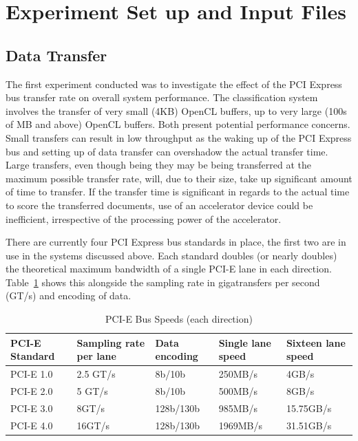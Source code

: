 \section{Experiment Set up and Input Files}

\subsection{Data Transfer}

The first experiment conducted was to investigate the effect of the PCI Express
bus transfer rate on overall system performance. The classification system
involves the transfer of very small (4KB) OpenCL buffers, up to very large (100s
of MB and above) OpenCL buffers. Both present potential performance concerns.
Small transfers can result in low throughput as the waking up of the PCI Express
bus and setting up of data transfer can overshadow the actual transfer time.
Large transfers, even though being they may be being transferred at the maximum
possible transfer rate, will, due to their size, take up significant amount of
time to transfer. If the transfer time is significant in regards to the actual
time to score the transferred documents, use of an accelerator device could be
inefficient, irrespective of the processing power of the accelerator.

There are currently four PCI Express bus standards in place, the first two are
in use in the systems discussed above. Each standard doubles (or nearly doubles)
the theoretical maximum bandwidth of a single PCI-E lane in each direction.
Table~\ref{table:pciE} shows this alongside the sampling rate in gigatransfers
per second (GT/s) and encoding of data.

\begin{table}[H]
\begin{tabular}{|l|l|l|l|l|}
\hline
PCI-E Standard & Sampling rate per lane & Data encoding & Single lane speed &
Sixteen lane speed\\
\hline
PCI-E 1.0 & 2.5 GT/s & 8b/10b & 250MB/s & 4GB/s\\
\hline
PCI-E 2.0 & 5 GT/s & 8b/10b & 500MB/s & 8GB/s\\
\hline
PCI-E 3.0 & 8GT/s & 128b/130b & 985MB/s & 15.75GB/s\\
\hline
PCI-E 4.0 & 16GT/s & 128b/130b & 1969MB/s & 31.51GB/s\\
\hline
\end{tabular}
\caption{PCI-E Bus Speeds (each direction)}
\label{table:pciE}
\end{table}

